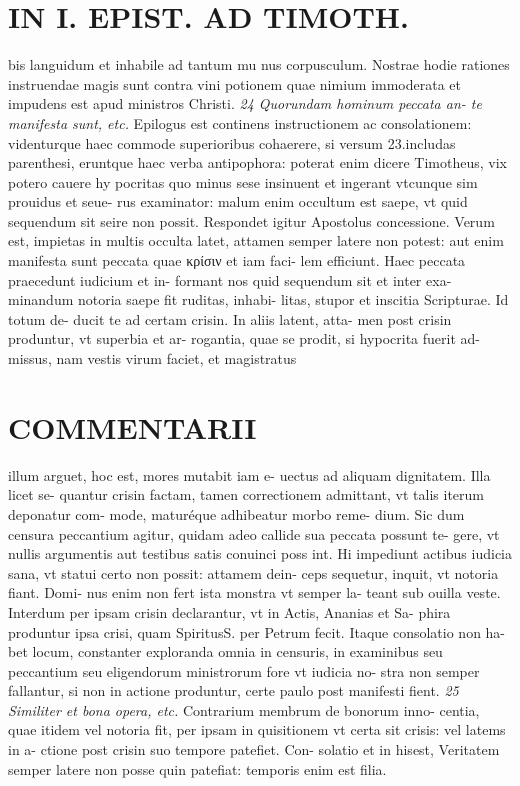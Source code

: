 \documentclass{article}
\begin{document}
\begin{pages}
\section*{IN I. EPIST. AD TIMOTH. }
\marginpar{[ p.141 ]}\pstart bis languidum et inhabile ad tantum mu nus corpusculum. Nostrae hodie rationes instruendae magis sunt contra vini potionem quae nimium immoderata et impudens est apud ministros Christi.  \pend
\textit{24 Quorundam hominum peccata an- te manifesta sunt, etc. }\pstart Epilogus est continens instructionem ac consolationem: videnturque haec commode superioribus cohaerere, si versum 23.includas parenthesi, eruntque haec verba antipophora: poterat enim dicere Timotheus, vix potero cauere hy pocritas quo minus sese insinuent et ingerant vtcunque sim prouidus et seue- rus examinator: malum enim occultum est saepe, vt quid sequendum sit seire non possit. Respondet igitur Apostolus concessione. Verum est, impietas in multis occulta latet, attamen semper latere non potest: aut enim manifesta sunt peccata quae κρίσιν et iam faci- lem efficiunt.  \pend\pstart Haec peccata praecedunt iudicium et in- formant nos quid sequendum sit et inter exa- minandum notoria saepe fit ruditas, inhabi- litas, stupor et inscitia Scripturae. Id totum de- ducit te ad certam crisin. In aliis latent, atta- men post crisin produntur, vt superbia et ar- rogantia, quae se prodit, si hypocrita fuerit ad- missus, nam vestis virum faciet, et magistratus  \pend
\marginpar{[ p.142 ]}
\section*{COMMENTARII }\pstart illum arguet, hoc est, mores mutabit iam e- uectus ad aliquam dignitatem. Illa licet se- quantur crisin factam, tamen correctionem admittant, vt talis iterum deponatur com- mode, maturéque adhibeatur morbo reme- dium. Sic dum censura peccantium agitur, quidam adeo callide sua peccata possunt te- gere, vt nullis argumentis aut testibus satis conuinci poss int. Hi impediunt actibus iudicia sana, vt statui certo non possit: attamem dein- ceps sequetur, inquit, vt notoria fiant. Domi- nus enim non fert ista monstra vt semper la- teant sub ouilla veste. Interdum per ipsam crisin declarantur, vt in Actis, Ananias et Sa- phira produntur ipsa crisi, quam SpiritusS. per Petrum fecit. Itaque consolatio non ha- bet locum, constanter exploranda omnia in censuris, in examinibus seu peccantium seu eligendorum ministrorum fore vt iudicia no- stra non semper fallantur, si non in actione produntur, certe paulo post manifesti fient.  \pend
\textit{25 Similiter et bona opera, etc. }\pstart Contrarium membrum de bonorum inno- centia, quae itidem vel notoria fit, per ipsam in quisitionem vt certa sit crisis: vel latems in a- ctione post crisin suo tempore patefiet. Con- solatio et in hisest, Veritatem semper latere non posse quin patefiat: temporis enim est filia.  \pend

\end{pages}
\end{document}
